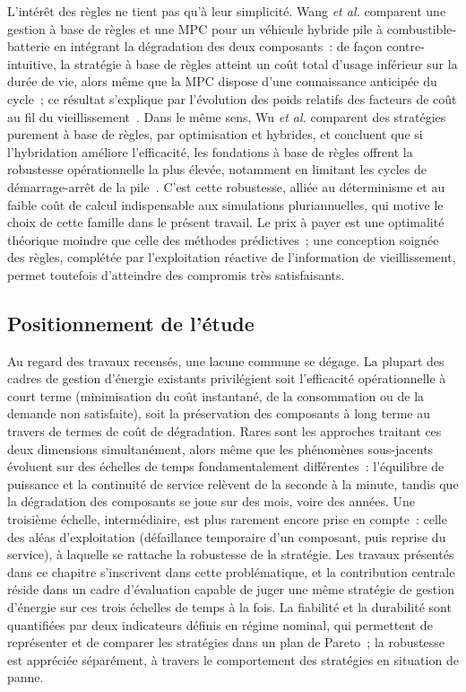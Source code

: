L'intérêt des règles ne tient pas qu'à leur simplicité.
Wang \textit{et al.} comparent une gestion à base de règles et une MPC pour un véhicule hybride pile à combustible-batterie en intégrant la dégradation des deux composants~: de façon contre-intuitive, la stratégie à base de règles atteint un coût total d'usage inférieur sur la durée de vie, alors même que la MPC dispose d'une connaissance anticipée du cycle~; ce résultat s'explique par l'évolution des poids relatifs des facteurs de coût au fil du vieillissement~\cite{wang_comparison_2020}.
Dans le même sens, Wu \textit{et al.} comparent des stratégies purement à base de règles, par optimisation et hybrides, et concluent que si l'hybridation améliore l'efficacité, les fondations à base de règles offrent la robustesse opérationnelle la plus élevée, notamment en limitant les cycles de démarrage-arrêt de la pile~\cite{wu_rule_2023}.
C'est cette robustesse, alliée au déterminisme et au faible coût de calcul indispensable aux simulations pluriannuelles, qui motive le choix de cette famille dans le présent travail.
Le prix à payer est une optimalité théorique moindre que celle des méthodes prédictives~; une conception soignée des règles, complétée par l'exploitation réactive de l'information de vieillissement, permet toutefois d'atteindre des compromis très satisfaisants.

\subsection{Positionnement de l'étude}

Au regard des travaux recensés, une lacune commune se dégage.
La plupart des cadres de gestion d'énergie existants privilégient soit l'efficacité opérationnelle à court terme (minimisation du coût instantané, de la consommation ou de la demande non satisfaite), soit la préservation des composants à long terme au travers de termes de coût de dégradation.
Rares sont les approches traitant ces deux dimensions simultanément, alors même que les phénomènes sous-jacents évoluent sur des échelles de temps fondamentalement différentes~: l'équilibre de puissance et la continuité de service relèvent de la seconde à la minute, tandis que la dégradation des composants se joue sur des mois, voire des années.
Une troisième échelle, intermédiaire, est plus rarement encore prise en compte~: celle des aléas d'exploitation (défaillance temporaire d'un composant, puis reprise du service), à laquelle se rattache la robustesse de la stratégie. Les travaux présentés dans ce chapitre s'inscrivent dans cette problématique, et la contribution centrale réside dans un cadre d'évaluation capable de juger une même stratégie de gestion d'énergie sur ces trois échelles de temps à la fois. La fiabilité et la durabilité sont quantifiées par deux indicateurs définis en régime nominal, qui permettent de représenter et de comparer les stratégies dans un plan de Pareto~; la robustesse est appréciée séparément, à travers le comportement des stratégies en situation de panne.

